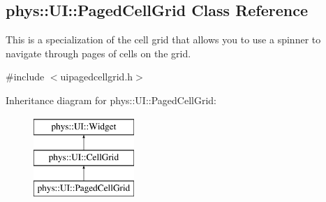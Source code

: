 \hypertarget{classphys_1_1UI_1_1PagedCellGrid}{
\subsection{phys::UI::PagedCellGrid Class Reference}
\label{classphys_1_1UI_1_1PagedCellGrid}
}


This is a specialization of the cell grid that allows you to use a spinner to navigate through pages of cells on the grid.  




{\ttfamily \#include $<$uipagedcellgrid.h$>$}

Inheritance diagram for phys::UI::PagedCellGrid:\begin{figure}[H]
\begin{center}
\leavevmode
\includegraphics[height=3.000000cm]{classphys_1_1UI_1_1PagedCellGrid}
\end{center}
\end{figure}
